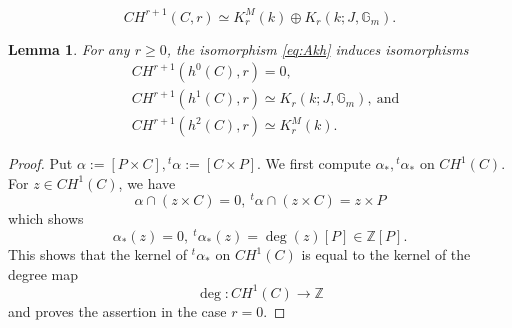 \documentclass[10pt,a4paper]{amsart}
\newtheorem{lem}{Lemma}
\newcommand{\Gm}{\mathbb{G}_{m}}
\newcommand{\Z}{\mathbb{Z}}
\begin{document}
\begin{equation}\label{eq:CH}
 CH^{r+1}(C,r)
 \simeq
 K_r^M(k)\oplus
 K_r(k;J,\Gm).
\end{equation}

\begin{lem}\label{lem:decomp_CH}
	For any $r\ge 0$, the isomorphism \eqref{eq:Akh} induces isomorphisms 
    \begin{align}
    &CH^{r+1}(h^0(C),r)=0,\\
    &CH^{r+1}(h^1(C),r)\simeq K_r(k;J,\Gm),\ \text{and}\\
    &CH^{r+1}(h^2(C),r)\simeq K_r^M(k).
    \end{align}
\end{lem}

\begin{proof}
%
%
%
%
    Put $\alpha:=[P\times C], {}^t\alpha:=[C\times P]$.
    We first compute $\alpha_\ast, {}^t\alpha_\ast$ on $CH^1(C)$.
    For $z\in CH^1(C)$, we have
    $$
    \alpha\cap (z\times C)=0,\ {}^t\alpha \cap (z\times C)=z\times P
    $$
    which shows
    $$
    \alpha_\ast(z)=0,\ {}^t\alpha_\ast(z)=\deg(z)[P]\in \Z[P].
    $$
    This shows that the kernel of ${}^t\alpha_\ast$ on $CH^1(C)$ is equal to the kernel of the degree map
    $$
    \deg:CH^1(C) \to \Z
    $$ and proves the assertion in the case $r=0$.
    


\end{proof}
\end{document}
